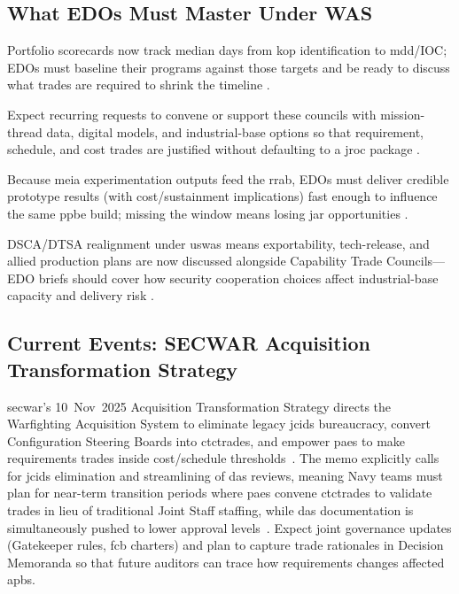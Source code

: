 \documentclass[../main.tex]{subfiles}
\begin{document}
\subsection{What EDOs Must Master Under WAS}
\begin{description}[style=nextline,labelsep=0.5em,font=\bfseries]
  \item[\textbf{Time-based metrics.}] Portfolio scorecards now track median days from \ac{kop} identification to \ac{mdd}/IOC; EDOs must baseline their programs against those targets and be ready to discuss what trades are required to shrink the timeline \autocite{secwar-was-memo-2025}.
  \item[\textbf{Capability Trade Councils.}] Expect recurring requests to convene or support these councils with mission-thread data, digital models, and industrial-base options so that requirement, schedule, and cost trades are justified without defaulting to a \ac{jroc} package \autocite{secwar-acq-transformation-2025}.
  \item[\textbf{Experiment-to-budget pipeline.}] Because \ac{meia} experimentation outputs feed the \ac{rrab}, EDOs must deliver credible prototype results (with cost/sustainment implications) fast enough to influence the same \ac{ppbe} build; missing the window means losing \ac{jar} opportunities \autocite{secwar-jcids-reform-2025}.
  \item[\textbf{Security cooperation touchpoints.}] DSCA/DTSA realignment under \ac{uswas} means exportability, tech-release, and allied production plans are now discussed alongside Capability Trade Councils---EDO briefs should cover how security cooperation choices affect industrial-base capacity and delivery risk \autocite{secwar-arms-transfer-2025}.
\end{description}

\subsection{Current Events: SECWAR Acquisition Transformation Strategy}
\ac{secwar}'s 10~Nov~2025 Acquisition Transformation Strategy directs the Warfighting Acquisition System to eliminate legacy \ac{jcids} bureaucracy, convert Configuration Steering Boards into \acp{ctctrade}, and empower \acp{pae} to make requirements trades inside cost/schedule thresholds~\autocite{secwar-acq-transformation-2025}. The memo explicitly calls for \ac{jcids} elimination and streamlining of \ac{das} reviews, meaning Navy teams must plan for near-term transition periods where \acp{pae} convene \acp{ctctrade} to validate trades in lieu of traditional Joint Staff staffing, while \ac{das} documentation is simultaneously pushed to lower approval levels~\autocite{secwar-acq-transformation-2025}. Expect joint governance updates (Gatekeeper rules, \ac{fcb} charters) and plan to capture trade rationales in Decision Memoranda so that future auditors can trace how requirements changes affected \acp{apb}.

\end{document}

